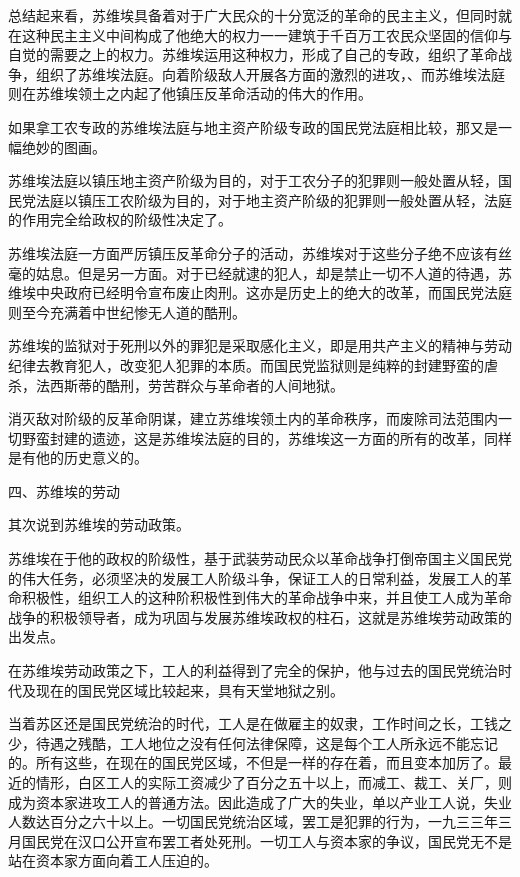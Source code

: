 总结起来看，苏维埃具备着对于广大民众的十分宽泛的革命的民主主义，但同时就在这种民主主义中间构成了他绝大的权力一一建筑于千百万工农民众坚固的信仰与自觉的需要之上的权力。苏维埃运用这种权力，形成了自己的专政，组织了革命战争，组织了苏维埃法庭。向着阶级敌人开展各方面的激烈的进攻，、而苏维埃法庭则在苏维埃领土之内起了他镇压反革命活动的伟大的作用。

如果拿工农专政的苏维埃法庭与地主资产阶级专政的国民党法庭相比较，那又是一幅绝妙的图画。

苏维埃法庭以镇压地主资产阶级为目的，对于工农分子的犯罪则一般处置从轻，国民党法庭以镇压工农阶级为目的，对于地主资产阶级的犯罪则一般处置从轻，法庭的作用完全给政权的阶级性决定了。

苏维埃法庭一方面严厉镇压反革命分子的活动，苏维埃对于这些分子绝不应该有丝毫的姑息。但是另一方面。对于已经就逮的犯人，却是禁止一切不人道的待遇，苏维埃中央政府已经明令宣布废止肉刑。这亦是历史上的绝大的改革，而国民党法庭则至今充满着中世纪惨无人道的酷刑。

苏维埃的监狱对于死刑以外的罪犯是采取感化主义，即是用共产主义的精神与劳动纪律去教育犯人，改变犯人犯罪的本质。而国民党监狱则是纯粹的封建野蛮的虐杀，法西斯蒂的酷刑，劳苦群众与革命者的人间地狱。

消灭敌对阶级的反革命阴谋，建立苏维埃领土内的革命秩序，而废除司法范围内一切野蛮封建的遗迹，这是苏维埃法庭的目的，苏维埃这一方面的所有的改革，同样是有他的历史意义的。

四、苏维埃的劳动

其次说到苏维埃的劳动政策。

苏维埃在于他的政权的阶级性，基于武装劳动民众以革命战争打倒帝国主义国民党的伟大任务，必须坚决的发展工人阶级斗争，保证工人的日常利益，发展工人的革命积极性，组织工人的这种阶积极性到伟大的革命战争中来，并且使工人成为革命战争的积极领导者，成为巩固与发展苏维埃政权的柱石，这就是苏维埃劳动政策的出发点。

在苏维埃劳动政策之下，工人的利益得到了完全的保护，他与过去的国民党统治时代及现在的国民党区域比较起来，具有天堂地狱之别。

当着苏区还是国民党统治的时代，工人是在做雇主的奴隶，工作时间之长，工钱之少，待遇之残酷，工人地位之没有任何法律保障，这是每个工人所永远不能忘记的。所有这些，在现在的国民党区域，不但是一样的存在着，而且变本加厉了。最近的情形，白区工人的实际工资减少了百分之五十以上，而减工、裁工、关厂，则成为资本家进攻工人的普通方法。因此造成了广大的失业，单以产业工人说，失业人数达百分之六十以上。一切国民党统治区域，罢工是犯罪的行为，一九三三年三月国民党在汉口公开宣布罢工者处死刑。一切工人与资本家的争议，国民党无不是站在资本家方面向着工人压迫的。


